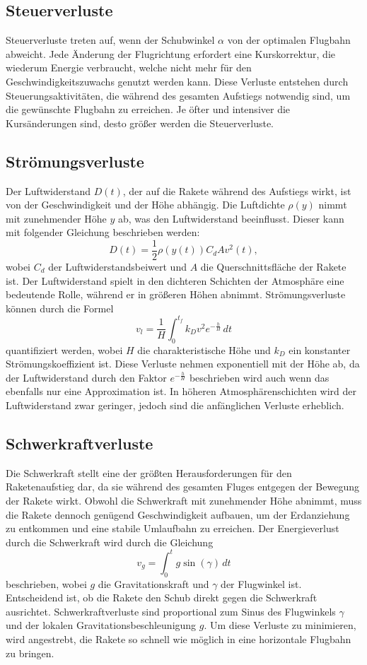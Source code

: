 \subsection{Steuerverluste}
Steuerverluste treten auf, wenn der Schubwinkel \(\alpha\) von der optimalen Flugbahn abweicht. 
Jede Änderung der Flugrichtung erfordert eine Kurskorrektur, die wiederum Energie verbraucht, welche nicht mehr für den Geschwindigkeitszuwachs genutzt werden kann. 
Diese Verluste entstehen durch Steuerungsaktivitäten, die während des gesamten Aufstiegs notwendig sind, um die gewünschte Flugbahn zu erreichen. 
Je öfter und intensiver die Kursänderungen sind, desto größer werden die Steuerverluste.

\subsection{Strömungsverluste}
Der Luftwiderstand \(D(t)\), der auf die Rakete während des Aufstiegs wirkt, ist von der Geschwindigkeit und der Höhe abhängig. 
Die Luftdichte \(\rho(y)\) nimmt mit zunehmender Höhe \(y\) ab, was den Luftwiderstand beeinflusst. 
Dieser kann mit folgender Gleichung beschrieben werden:
\[
D(t) = \frac{1}{2} \rho(y(t)) C_d A v^2(t),
\]
wobei \(C_d\) der Luftwiderstandsbeiwert und \(A\) die Querschnittsfläche der Rakete ist. 
Der Luftwiderstand spielt in den dichteren Schichten der Atmosphäre eine bedeutende Rolle, während er in größeren Höhen abnimmt.
Strömungsverluste können durch die Formel
\[
v_l = \frac{1}{H} \int_0^{t_f} k_D v^2 e^{-\frac{h}{H}} \, dt
\]
quantifiziert werden, wobei \(H\) die charakteristische Höhe und \(k_D\) ein konstanter Strömungskoeffizient ist. 
Diese Verluste nehmen exponentiell mit der Höhe ab, da der Luftwiderstand durch den Faktor \(e^{-\frac{h}{H}}\) beschrieben wird auch wenn das ebenfalls nur eine Approximation ist. 
In höheren Atmosphärenschichten wird der Luftwiderstand zwar geringer, jedoch sind die anfänglichen Verluste erheblich.

\subsection{Schwerkraftverluste}
Die Schwerkraft stellt eine der größten Herausforderungen für den Raketenaufstieg dar, da sie während des gesamten Fluges entgegen der Bewegung der Rakete wirkt. 
Obwohl die Schwerkraft mit zunehmender Höhe abnimmt, muss die Rakete dennoch genügend Geschwindigkeit aufbauen, um der Erdanziehung zu entkommen und eine stabile Umlaufbahn zu erreichen. 
Der Energieverlust durch die Schwerkraft wird durch die Gleichung
\[
v_g = \int_0^t g \sin(\gamma) \, dt
\]
beschrieben, wobei \(g\) die Gravitationskraft und \(\gamma\) der Flugwinkel ist. 
Entscheidend ist, ob die Rakete den Schub direkt gegen die Schwerkraft ausrichtet.
Schwerkraftverluste sind proportional zum Sinus des Flugwinkels \(\gamma\) und der lokalen Gravitationsbeschleunigung \(g\). 
Um diese Verluste zu minimieren, wird angestrebt, die Rakete so schnell wie möglich in eine horizontale Flugbahn zu bringen.

